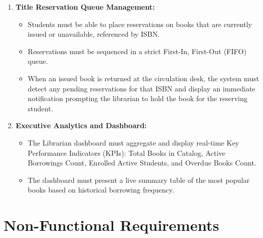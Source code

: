 \begin{enumerate}[label=\textbf{FR-\arabic*:}, leftmargin=2.5cm]
    \item \textbf{Title Reservation Queue Management:}
    \begin{itemize}
        \item Students must be able to place reservations on books that are currently issued or unavailable, referenced by ISBN.
        \item Reservations must be sequenced in a strict First-In, First-Out (FIFO) queue.
        \item When an issued book is returned at the circulation desk, the system must detect any pending reservations for that ISBN and display an immediate notification prompting the librarian to hold the book for the reserving student.
    \end{itemize}

    \item \textbf{Executive Analytics and Dashboard:}
    \begin{itemize}
        \item The Librarian dashboard must aggregate and display real-time Key Performance Indicators (KPIs): Total Books in Catalog, Active Borrowings Count, Enrolled Active Students, and Overdue Books Count.
        \item The dashboard must present a live summary table of the most popular books based on historical borrowing frequency.
    \end{itemize}
\end{enumerate}

\section{Non-Functional Requirements}

